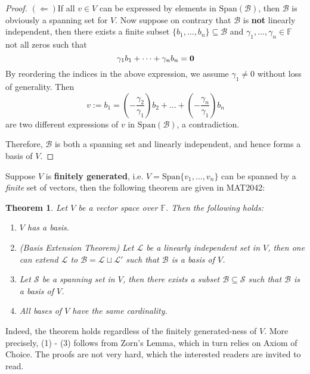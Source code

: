\documentclass[11pt,openany]{book}
\theoremstyle{plain}
\newtheorem{theorem}{Theorem}[chapter]
\theoremstyle{definition}
\theoremstyle{remark}
\begin{document}
\begin{proof}
    \noindent $(\Leftarrow) $If all $v \in V$ can be expressed by elements in $\mathrm{Span}(\mathcal{B})$, then $\mathcal{B}$ is obviously a spanning set for $V$. Now suppose on contrary that $\mathcal{B}$ is {\bf not} linearly independent, then there exists a finite subset $\{b_1,\dots, b_n\} \subseteq \mathcal{B}$ and $\gamma_1, \dots, \gamma_n \in \mathbb{F}$ not all zeros such that
    $$\gamma_1b_1 + \dots + \gamma_nb_n = {\bf 0}$$
    By reordering the indices in the above expression, we assume $\gamma_1 \neq 0$ without loss of generality. Then
    $$v := b_1 = (-\frac{\gamma_2}{\gamma_1}) b_2 + \dots + (-\frac{\gamma_n}{\gamma_1})b_n$$
    are two different expressions of $v$ in $\mathrm{Span}(\mathcal{B})$, a contradiction. 
    
    Therefore, $\mathcal{B}$ is both a spanning set and linearly independent, and hence forms a basis of $V$.
\end{proof}


Suppose $V$ is {\bf finitely generated}, i.e. $V =\mathrm{Span}\{v_1, \dots, v_n\}$ can be spanned by a {\it finite} set of vectors, then the following theorem are given in MAT2042:
\begin{theorem} \label{thm-basisextension}
    Let $V$ be a vector space over $\mathbb{F}$. Then the following holds:
    \begin{enumerate}
        \item $V$ has a basis.
        \item (Basis Extension Theorem) Let $\mathcal{L}$ be a linearly independent set in $V$, then one can extend $\mathcal{L}$ to $\mathcal{B} = \mathcal{L} \sqcup \mathcal{L}'$ such that $\mathcal{B}$ is a basis of $V$.
        \item Let $\mathcal{S}$ be a spanning set in $V$, then there exists a subset $\mathcal{B} \subseteq \mathcal{S}$ such that $\mathcal{B}$ is a basis of $V$.
        \item All bases of $V$ have the same cardinality.
    \end{enumerate}
\end{theorem}
Indeed, the theorem holds regardless of the finitely generated-ness of $V$. More precisely, (1) - (3) follows from  Zorn's Lemma, which in turn relies on Axiom of Choice. The proofs are not very hard, which the interested readers are invited to read.
\end{document}
